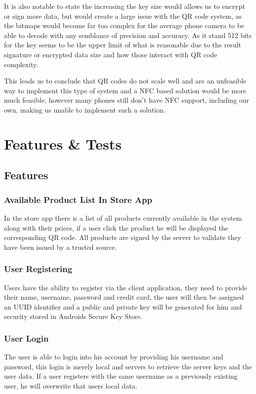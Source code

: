 \documentclass[12pt]{article}
\begin{document}
It is also notable to state the increasing the key size would allows us to encrypt or sign more data, but would create a large issue with the QR code system, as the
bitmaps would become far too complex for the average phone camera to be able to decode with any semblance of precision and accuracy. As it stand 512 bits for the
key seems to be the upper limit of what is reasonable due to the result signature or encrypted data size and how those interact with QR code complexity.

This leads us to conclude that QR codes do not scale well and are an unfeasible way to implement this type of system and a NFC based solution would be more much feasible,
however many phones still don't have NFC support, including our own, making us unable to implement such a solution.

\pagebreak
\section{Features \& Tests}

\subsection{Features}

\subsubsection{Available Product List In Store App}
\hspace{0.6cm}
In the store app there is a list of all products currently available in the system along with their prices, if a user click the product
he will be displayed the corresponding QR code. All products are signed by the server to validate they have been issued by a trusted source.

\subsubsection{User Registering}
\hspace{0.6cm}
Users have the ability to register via the client application, they need to provide their name, username, password and credit card, the user
will then be assigned an UUID identifier and a public and private key will be generated for him and security stored in Androids Secure Key Store.

\subsubsection{User Login}
\hspace{0.6cm}
The user is able to login into his account by providing his username and password, this login is merely local and servers to retrieve the server keys
and the user data. If a user registers with the same username as a previously existing user, he will overwrite that users local data.
\end{document}
